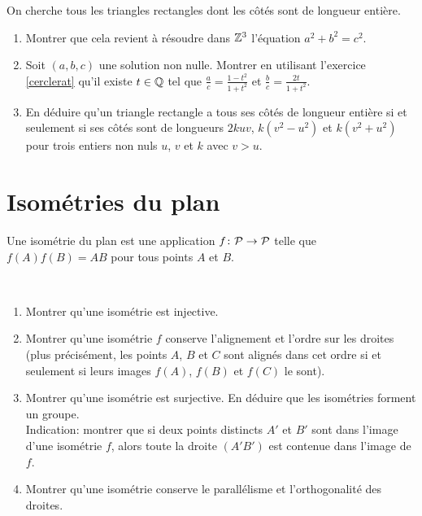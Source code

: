 \documentclass[a4paper,11pt,reqno]{amsart}
\begin{document}
\begin{exo} On cherche tous les triangles rectangles dont les côtés sont de longueur entière.
 \begin{enumerate}
  \item Montrer que cela revient à résoudre dans $\mathbb{Z}^3$ l'équation $a^2+b^2=c^2$.
  \item Soit $(a,b,c)$ une solution non nulle. Montrer en utilisant l'exercice \ref{cerclerat} qu'il  existe $t \in \mathbb{Q}$ tel que $\frac{a}{c}= \frac{1-t^2}{1+t^2}$ et $\frac{b}{c}= \frac{2t}{1+t^2}$.
  \item En déduire qu'un triangle rectangle a tous ses côtés de longueur entière si et seulement si ses côtés sont de longueurs $2kuv$, $k(v^2-u^2)$ et $k(v^2+u^2)$ pour trois entiers non nuls $u$, $v$ et $k$ avec $v>u$.
 \end{enumerate}

\end{exo}

\section{Isométries du plan}

Une isométrie du plan est une application $f \colon \mathcal{P} \to \mathcal{P}$ telle que $f(A)f(B)=AB$ pour tous points $A$ et $B$.

\begin{exo} \
 \begin{enumerate}
  \item Montrer qu'une isométrie est injective.
  \item Montrer qu'une isométrie $f$ conserve l'alignement et l'ordre sur les droites (plus précisément, les points $A$, $B$ et $C$ sont alignés dans cet ordre si et seulement si leurs images $f(A)$, $f(B)$ et $f(C)$ le sont).
  \item Montrer qu'une isométrie est surjective. En déduire que les isométries forment un groupe.
\\ Indication: montrer que si deux points distincts $A'$ et $B'$ sont dans l'image d'une isométrie $f$, alors toute la droite $(A'B')$ est contenue dans l'image de $f$.
  \item Montrer qu'une isométrie conserve le parallélisme et l'orthogonalité des droites.
 \end{enumerate}
\end{exo}
\end{document}
